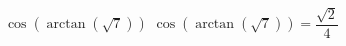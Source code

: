  {$\cos\left(\arctan\left(\sqrt{7} \right)\right)$}
{ $\cos\left(\arctan\left(\sqrt{7} \right)\right) = \dfrac{\sqrt{2}}{4}$}
